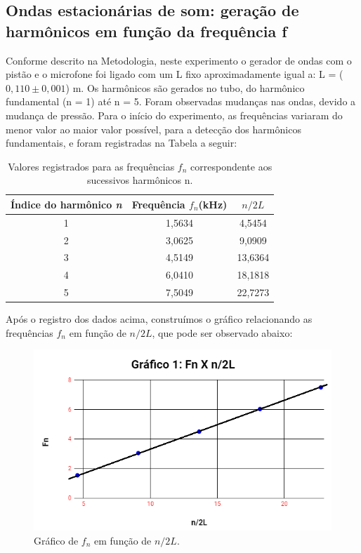 \subsection{Ondas estacionárias de som: geração de harmônicos
em função da frequência f}

Conforme descrito na Metodologia, neste experimento o gerador de ondas com o pistão e o microfone foi ligado com um L fixo aproximadamente igual a: L = ($0,110 \pm 0,001$) m. Os harmônicos são gerados no tubo, do harmônico fundamental (n = 1) até n = 5. Foram observadas mudanças nas ondas, devido a mudança de pressão.  Para o início do experimento, as frequências variaram do menor valor ao maior valor possível, para a detecção dos harmônicos fundamentais, e foram registradas na Tabela a seguir:

\begin{table}[H]
    \centering
    \begin{tabular}{ |c||c||c|  }
        \hline
        \textbf{Índice do harmônico \textit{n}} & \textbf{Frequência \textit{$f_n$}(kHz)} & \textbf{$n/2L$}\\
        \hline 
         1&	1,5634&	4,5454	\\
         
         2&	3,0625&	9,0909 \\
         
         3&	4,5149&	13,6364 \\
         
         4&	6,0410&	18,1818 \\
         
         5&	7,5049&	22,7273 \\
        \hline
    \end{tabular}
    \caption{Valores registrados para as frequências $f_n$ correspondente aos sucessivos harmônicos n.} 
\end{table}

Após o registro dos dados acima, construímos o gráfico relacionando as frequências $f_n$ em função de $n/2L$, que pode ser observado abaixo:

\begin{figure}[H]
  \centering
  \includegraphics[scale=0.8]{images/gráfico 1.png}
  \caption{ Gráfico de $f_n$ em função de $n/2L$.}
\end{figure}

